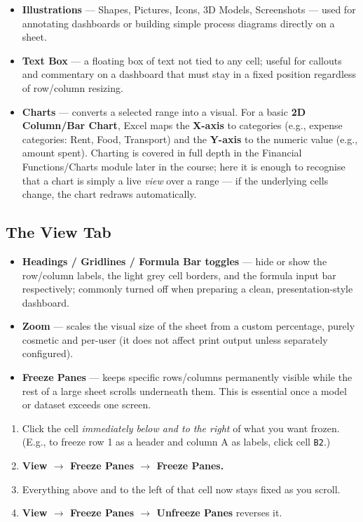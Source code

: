 \documentclass[11pt,a4paper]{article}
\begin{document}
\begin{itemize}
  \item \textbf{Illustrations} --- Shapes, Pictures, Icons, 3D Models, Screenshots --- used for annotating dashboards or building simple process diagrams directly on a sheet.
  \item \textbf{Text Box} --- a floating box of text not tied to any cell; useful for callouts and commentary on a dashboard that must stay in a fixed position regardless of row/column resizing.
  \item \textbf{Charts} --- converts a selected range into a visual. For a basic \textbf{2D Column/Bar Chart}, Excel maps the \textbf{X-axis} to categories (e.g., expense categories: Rent, Food, Transport) and the \textbf{Y-axis} to the numeric value (e.g., amount spent). Charting is covered in full depth in the Financial Functions/Charts module later in the course; here it is enough to recognise that a chart is simply a live \emph{view} over a range --- if the underlying cells change, the chart redraws automatically.
\end{itemize}

\subsection{The View Tab}

\begin{itemize}
  \item \textbf{Headings / Gridlines / Formula Bar toggles} --- hide or show the row/column labels, the light grey cell borders, and the formula input bar respectively; commonly turned off when preparing a clean, presentation-style dashboard.
  \item \textbf{Zoom} --- scales the visual size of the sheet from a custom percentage, purely cosmetic and per-user (it does not affect print output unless separately configured).
  \item \textbf{Freeze Panes} --- keeps specific rows/columns permanently visible while the rest of a large sheet scrolls underneath them. This is essential once a model or dataset exceeds one screen.
\end{itemize}

\begin{formulasyntax}
\begin{enumerate}
  \item Click the cell \emph{immediately below and to the right} of what you want frozen. (E.g., to freeze row 1 as a header and column A as labels, click cell \texttt{B2}.)
  \item \textbf{View $\rightarrow$ Freeze Panes $\rightarrow$ Freeze Panes.}
  \item Everything above and to the left of that cell now stays fixed as you scroll.
  \item \textbf{View $\rightarrow$ Freeze Panes $\rightarrow$ Unfreeze Panes} reverses it.
\end{enumerate}
\end{formulasyntax}
\end{document}
